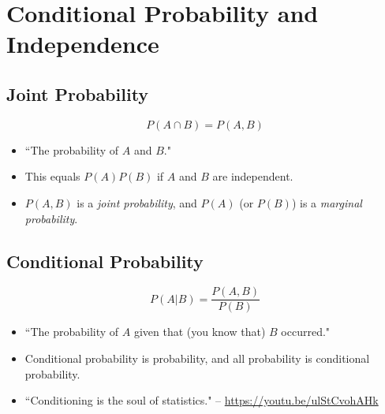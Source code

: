 \documentclass{article}
\begin{document}

\section{Conditional Probability and Independence}

\subsection{Joint Probability}

$$P(A \cap B) = P(A, B)$$

\begin{itemize}
    \item ``The probability of $A$ and $B$."
    \item This equals $P(A)P(B)$ if $A$ and $B$ are independent.
    \item $P(A, B)$ is a \textit{joint probability}, and $P(A)$ (or $P(B)$) is a \textit{marginal probability}.
\end{itemize}

\subsection{Conditional Probability}

$$P(A|B) = \frac{P(A, B)}{P(B)}$$
\begin{itemize}
    \item ``The probability of $A$ given that (you know that) $B$ occurred."
    \item Conditional probability is probability, and all probability is conditional probability.
    \item ``Conditioning is the soul of statistics." -- \url{https://youtu.be/ulStCvohAHk}
\end{itemize}
\end{document}

